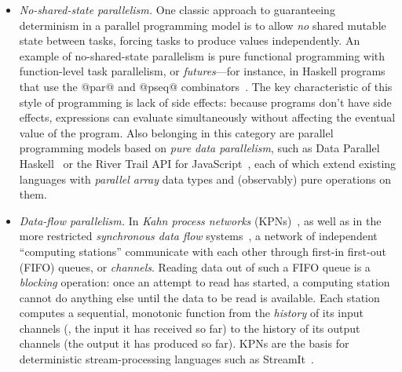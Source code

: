 \begin{itemize}
\item \emph{No-shared-state parallelism.}  One classic
  approach to guaranteeing determinism in a parallel programming model
  is to allow \emph{no} shared mutable state between tasks, forcing
  tasks to produce values independently.  An example of
  no-shared-state parallelism is pure functional programming with
  function-level task parallelism, or \emph{futures}---for instance,
  in Haskell programs that use the @par@ and @pseq@
  combinators~\cite{marlow-par}.  The key characteristic of this style
  of programming is lack of side effects: because programs don't have
  side effects, expressions can evaluate simultaneously without
  affecting the eventual value of the program.  Also belonging in this
  category are parallel programming models based on \emph{pure data
    parallelism}, such as Data Parallel Haskell~\cite{dph, dph-status}
  or the River Trail API for JavaScript~\cite{river-trail}, each of
  which extend existing languages with \emph{parallel array} data
  types and (observably) pure operations on them.

\item \emph{Data-flow parallelism.}  In
  \emph{Kahn process networks} (KPNs)~\cite{Kahn-1974}, as well as in
  the more restricted \emph{synchronous data flow}
  systems~\cite{Lee-sdn}, a network of independent ``computing
  stations'' communicate with each other through first-in first-out
  (FIFO) queues, or \emph{channels}.  Reading data out of such a FIFO
  queue is a \emph{blocking} operation: once an attempt to read has
  started, a computing station cannot do anything else until the data
  to be read is available.  Each station computes a sequential,
  monotonic function from the \emph{history} of its input channels
  (\ie, the input it has received so far) to the history of its output
  channels (the output it has produced so far).  KPNs are the basis
  for deterministic stream-processing languages such as
  StreamIt~\cite{streamit-asplos}.


\end{itemize}

